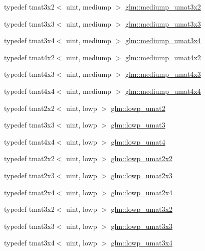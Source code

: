 \begin{DoxyCompactItemize}
typedef tmat3x2$<$ uint, mediump $>$ \hyperlink{group__gtc__matrix__integer_ga62243caa5b85b1cf91021ce6ffc21183}{glm\-::mediump\-\_\-umat3x2}
\item 
typedef tmat3x3$<$ uint, mediump $>$ \hyperlink{group__gtc__matrix__integer_gaa55f7815a399a780907a1dcd4caef7d9}{glm\-::mediump\-\_\-umat3x3}
\item 
typedef tmat3x4$<$ uint, mediump $>$ \hyperlink{group__gtc__matrix__integer_ga21a2361cc10822ad1a2297ac286c8e26}{glm\-::mediump\-\_\-umat3x4}
\item 
typedef tmat4x2$<$ uint, mediump $>$ \hyperlink{group__gtc__matrix__integer_ga9dd5ce011ca43d90cf1b94084c7e90ac}{glm\-::mediump\-\_\-umat4x2}
\item 
typedef tmat4x3$<$ uint, mediump $>$ \hyperlink{group__gtc__matrix__integer_gac91ed5aa76fe160d5ab5d31e2b94d95b}{glm\-::mediump\-\_\-umat4x3}
\item 
typedef tmat4x4$<$ uint, mediump $>$ \hyperlink{group__gtc__matrix__integer_ga7141a9d9f1c26521e397be34d19c1b8f}{glm\-::mediump\-\_\-umat4x4}
\item 
typedef tmat2x2$<$ uint, lowp $>$ \hyperlink{group__gtc__matrix__integer_ga0ff71fefa5bfab1462195c3de4f83f67}{glm\-::lowp\-\_\-umat2}
\item 
typedef tmat3x3$<$ uint, lowp $>$ \hyperlink{group__gtc__matrix__integer_ga71b66cc4f5e2d30b64ec99425562a6b6}{glm\-::lowp\-\_\-umat3}
\item 
typedef tmat4x4$<$ uint, lowp $>$ \hyperlink{group__gtc__matrix__integer_gaa430d894a3290d551061d0d77c017cec}{glm\-::lowp\-\_\-umat4}
\item 
typedef tmat2x2$<$ uint, lowp $>$ \hyperlink{group__gtc__matrix__integer_ga13b2812e9b0af47e0f498391383d145a}{glm\-::lowp\-\_\-umat2x2}
\item 
typedef tmat2x3$<$ uint, lowp $>$ \hyperlink{group__gtc__matrix__integer_ga3af254ecb450000314422b1730afacc0}{glm\-::lowp\-\_\-umat2x3}
\item 
typedef tmat2x4$<$ uint, lowp $>$ \hyperlink{group__gtc__matrix__integer_gad5e8f08c103d5dd33767e31938357aa6}{glm\-::lowp\-\_\-umat2x4}
\item 
typedef tmat3x2$<$ uint, lowp $>$ \hyperlink{group__gtc__matrix__integer_ga3ea8482ddaa10befe8dc2d681d86bb59}{glm\-::lowp\-\_\-umat3x2}
\item 
typedef tmat3x3$<$ uint, lowp $>$ \hyperlink{group__gtc__matrix__integer_gab27a50de8b11ec09b2f5cf1cf4c1a062}{glm\-::lowp\-\_\-umat3x3}
\item 
typedef tmat3x4$<$ uint, lowp $>$ \hyperlink{group__gtc__matrix__integer_ga2ed807c71afb8c0f8742bb03e9f71829}{glm\-::lowp\-\_\-umat3x4}

\end{DoxyCompactItemize}
